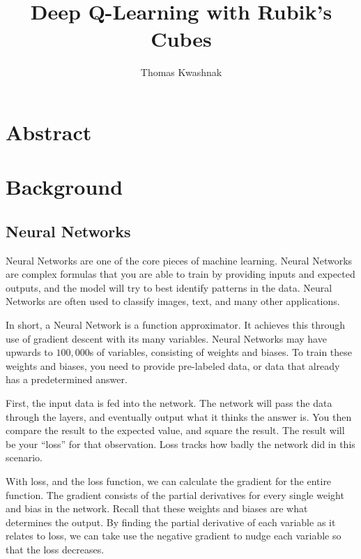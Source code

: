 \documentclass[12pt]{article}
\title{Deep Q-Learning with Rubik's Cubes}
\author{Thomas Kwashnak}
\begin{document}
\begin{titlepage}

	\maketitle

\end{titlepage}

\tableofcontents
\newpage


\section{Abstract}

\newpage

\section{Background}

\subsection{Neural Networks}

Neural Networks are one of the core pieces of machine learning. Neural Networks are complex formulas that you are able to train by providing inputs and expected outputs, and the model will try to best identify patterns in the data. Neural Networks are often used to classify images, text, and many other applications.

In short, a Neural Network is a function approximator. It achieves this through use of gradient descent with its many variables. Neural Networks may have upwards to $100,000$s of variables, consisting of weights and biases. To train these weights and biases, you need to provide pre-labeled data, or data that already has a predetermined answer.

First, the input data is fed into the network. The network will pass the data through the layers, and eventually output what it thinks the answer is. You then compare the result to the expected value, and square the result. The result will be your ``loss'' for that observation. Loss tracks how badly the network did in this scenario. 

With loss, and the loss function, we can calculate the gradient for the entire function. The gradient consists of the partial derivatives for every single weight and bias in the network. Recall that these weights and biases are what determines the output. By finding the partial derivative of each variable as it relates to loss, we can take use the negative gradient to nudge each variable so that the loss decreases.
\end{document}
